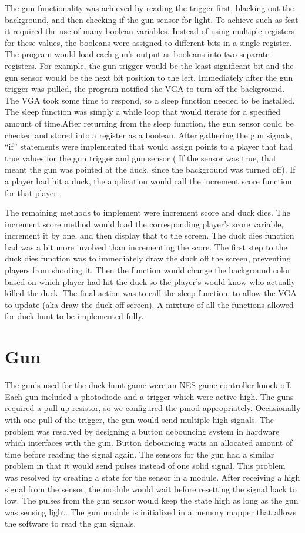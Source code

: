 \documentclass[letterpaper, 11 pt, conference]{article}
\begin{document}
The gun functionality was achieved by reading the trigger first, blacking out the background, and then checking if the gun sensor for light. To achieve such as feat it required the use of many boolean variables. Instead of using multiple registers for these values, the booleans were assigned to different bits in a single register. The program would load each gun’s output as booleans into two separate registers. For example, the gun trigger would be the least significant bit and the gun sensor would be the next bit position to the left. Immediately after the gun trigger was pulled, the program notified the VGA to turn off the background. The VGA took some time to respond, so a sleep function needed to be installed. The sleep function was simply a while loop that would iterate for a specified amount of time.After returning from the sleep function, the gun sensor could be checked and stored into a register as a boolean. After gathering the gun signals, “if” statements were implemented that would assign points to a player that had true values for the gun trigger and gun sensor ( If the sensor was true, that meant the gun was pointed at the duck, since the background was turned off). If a player had hit a duck, the application would call the increment score function for that player. 

The remaining methods to implement were increment score and duck dies. The increment score method would load the corresponding player’s score variable, increment it by one, and then display that to the screen. The duck dies function had was a bit more involved than incrementing the score. The first step to the duck dies function was to immediately draw the duck off the screen, preventing players from shooting it. Then the function would change the background color based on which player had hit the duck so the player’s would know who actually killed the duck. The final action was to call the sleep function, to allow the VGA to update (aka draw the duck off screen). A mixture of all the functions allowed for duck hunt to be implemented fully.


\section{Gun}

The gun’s used for the duck hunt game were an NES game controller knock off. Each gun included a photodiode and a trigger which were active high. The guns required a pull up resistor, so we configured the pmod appropriately. Occasionally with one pull of the trigger, the gun would send multiple high signals. The problem was resolved by designing a button debouncing system in hardware which interfaces with the gun. Button debouncing waits an allocated amount of time before reading the signal again. The sensors for the gun had a similar problem in that it would send pulses instead of one solid signal. This problem was resolved by creating a state for the sensor in a module. After receiving a high signal from the sensor, the module would wait before resetting the signal back to low. The pulses from the gun sensor would keep the state high as long as the gun was sensing light. The gun module is initialized in a memory mapper that allows the software to read the gun signals.
\end{document}
